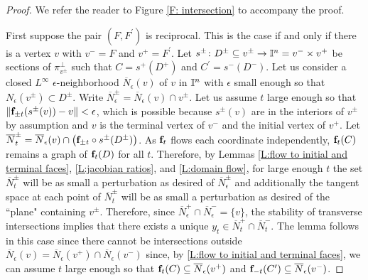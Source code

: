 \begin{proof}
	We refer the reader to Figure \ref{F: intersection} to accompany the proof.

	First suppose the pair $(F,F^\prime)$ is reciprocal.
	This is the case if and only if there is a vertex $v$ with $v^- = F$ and $v^+ = F^\prime$.
	Let $s^\pm \colon D^\pm \subseteq v^\pm \to \mathbb{I}^n = v^- \times v^+$ be sections of $\pi_{v^\pm}^\perp$ such that $C = s^+(D^+)$ and $C^\prime = s^-(D^-)$.
	Let us consider a closed $L^\infty$ $\epsilon$-neighborhood $\overline N_\epsilon(v)$ of $v$ in $\mathbb{I}^n$ with $\epsilon$ small enough so that $N_\epsilon(v^\pm) \subset D^\pm$.
	Write $\overline N_\epsilon^\pm = \overline N_\epsilon(v) \cap v^\pm$.
	Let us assume $t$ large enough so that $\Vert{\mathbf{f}_{\pm t}(s^\pm(v)) - v}\Vert < \epsilon$, which is possible because $s^\pm(v)$ are in the interiors of $v^\pm$ by assumption and $v$ is the terminal vertex of $v^-$ and the initial vertex of $v^+$.
	Let $\overline N_t^\pm = \overline N_\epsilon(v) \cap \big(\mathbf{f}_{\pm t}\circ s^\pm (D^\pm)\big)$.
	As $\mathbf{f}_t$ flows each coordinate independently, $\mathbf{f}_t(C)$ remains a graph of $\mathbf{f}_t(D)$ for all $t$.
	Therefore, by Lemmas \ref{L:flow to initial and terminal faces}, \ref{L:jacobian ratios}, and \ref{L:domain flow}, for large enough $t$ the set $\overline N_t^\pm$ will be as small a perturbation as desired of $\overline N_\epsilon^\pm$ and additionally the tangent space at each point of $\overline N_t^\pm$ will be as small a perturbation as desired of the ``plane" containing $v^\pm$.
	Therefore, since $\overline N_\epsilon^+ \cap \overline N_\epsilon^- = \{v\}$, the stability of transverse intersections implies that there exists a unique $y_t \in \overline N_t^+ \cap \overline N_t^-$.
	The lemma follows in this case since there cannot be intersections outside $\overline N_\epsilon(v) = \overline N_\epsilon(v^+) \cap \overline N_\epsilon(v^-)$ since, by \cref{L:flow to initial and terminal faces}, we can assume $t$ large enough so that $\mathbf{f}_t(C) \subseteq \overline N_\epsilon(v^+)$ and $\mathbf{f}_{-t}(C^\prime) \subseteq \overline N_\epsilon(v^-)$.


\end{proof}
